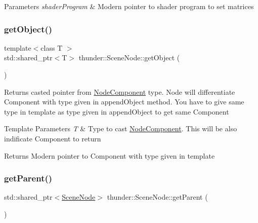 \begin{DoxyParams}{Parameters}
{\em shader\+Program} & Modern pointer to shader program to set matrices \\
\hline
\end{DoxyParams}
\mbox{\label{classthunder_1_1_scene_node_a2e50c38a3273b593be7ffaee9e057ae0}} 
\subsubsection{\texorpdfstring{get\+Object()}{getObject()}}
{\footnotesize\ttfamily template$<$class T $>$ \\
std\+::shared\+\_\+ptr$<$T$>$ thunder\+::\+Scene\+Node\+::get\+Object (\begin{DoxyParamCaption}{ }\end{DoxyParamCaption})\hspace{0.3cm}{\ttfamily [inline]}}

Returns casted pointer from \mbox{\hyperlink{classthunder_1_1_node_component}{Node\+Component}} type. Node will differentiate Component with type given in append\+Object method. You have to give same type in template as type given in append\+Object to get same Component


\begin{DoxyTemplParams}{Template Parameters}
{\em T} & Type to cast \mbox{\hyperlink{classthunder_1_1_node_component}{Node\+Component}}. This will be also indificate Component to return \\
\hline
\end{DoxyTemplParams}
\begin{DoxyReturn}{Returns}
Modern pointer to Component with type given in template 
\end{DoxyReturn}
\mbox{\label{classthunder_1_1_scene_node_a40697be350194752846a29c97f1337b7}} 
\subsubsection{\texorpdfstring{get\+Parent()}{getParent()}}
{\footnotesize\ttfamily std\+::shared\+\_\+ptr$<$\mbox{\hyperlink{classthunder_1_1_scene_node}{Scene\+Node}}$>$ thunder\+::\+Scene\+Node\+::get\+Parent (\begin{DoxyParamCaption}{ }\end{DoxyParamCaption})}

